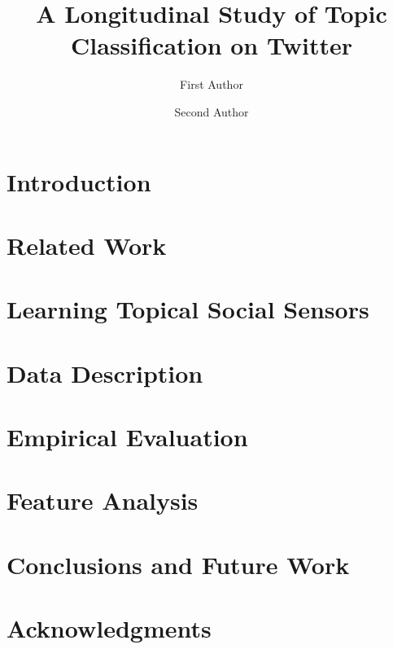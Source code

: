 \documentclass[fleqn,10pt,lineno]{wlpeerj} %
\title{A Longitudinal Study of Topic Classification on Twitter}
\author[1]{First Author}
\author[2]{Second Author}
\affil[1]{Address of first author}
\affil[2]{Address of second author}
\begin{document}
\flushbottom
\maketitle
\thispagestyle{empty}

\section*{Introduction}


%
%

\section*{Related Work}


\section*{Learning Topical Social Sensors}
\label{sec:lss}


\section*{Data Description}
\label{sec:datasetStatistics}


\section*{Empirical Evaluation}
\label{sec:methodology}


\section*{Feature Analysis}
\label{label:featureanalysis}


\section*{Conclusions and Future Work}


\section*{Acknowledgments}


\end{document}
